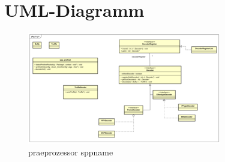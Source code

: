 \section{UML-Diagramm}

\begin{figure}
  \centering
  \includegraphics[width=\paperwidth]{../diagramimages/spp_profinet.png}
  \caption{\gls{praeprozessor} \gls{sppname}}
  
\end{figure}
